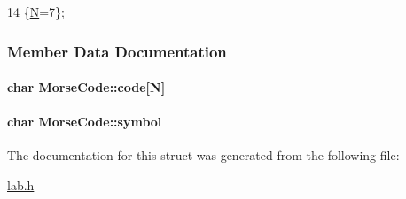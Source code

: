 \begin{DoxyCode}
14 \{\hyperlink{structMorseCode_ab70bfb3505458b9ca361321710a3bf4ea255fc4372695bc3e775c82488bfc2dac}{N}=7\};
\end{DoxyCode}


\subsubsection{Member Data Documentation}
\hypertarget{structMorseCode_aeb273082df944b0bc60d1388f215b1b7}{
\paragraph[{code}]{\setlength{\rightskip}{0pt plus 5cm}char Morse\+Code\+::code\mbox{[}{\bf N}\mbox{]}}}\label{structMorseCode_aeb273082df944b0bc60d1388f215b1b7}
\hypertarget{structMorseCode_a15f3e521a3db80ec2f44a9c42b5cb949}{
\paragraph[{symbol}]{\setlength{\rightskip}{0pt plus 5cm}char Morse\+Code\+::symbol}}\label{structMorseCode_a15f3e521a3db80ec2f44a9c42b5cb949}


The documentation for this struct was generated from the following file\+:\begin{DoxyCompactItemize}
\item 
\hyperlink{lab_8h}{lab.\+h}\end{DoxyCompactItemize}
